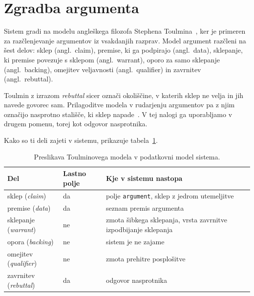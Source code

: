 \documentclass[a4paper, 12pt]{book}
\begin{document}
\section{Zgradba argumenta}
\label{sec:zgradba-argumenta}

Sistem gradi na modelu angleškega filozofa Stephena Toulmina~\cite{toulmin1958}, ker je primeren za razčlenjevanje argumentov iz vsakdanjih razprav. Model argument razčleni na šest delov: sklep (angl.\ claim), premise, ki ga podpirajo (angl.\ data), sklepanje, ki premise povezuje s sklepom (angl.\ warrant), oporo za samo sklepanje (angl.\ backing), omejitev veljavnosti (angl.\ qualifier) in zavrnitev (angl.\ rebuttal).

Toulmin z izrazom \textit{rebuttal} sicer označi okoliščine, v katerih sklep ne velja in jih navede govorec sam. Prilagoditve modela v rudarjenju argumentov pa z njim označijo nasprotno stališče, ki sklep napade~\cite{habernal2017}. V tej nalogi ga uporabljamo v drugem pomenu, torej kot odgovor nasprotnika.

Kako so ti deli zajeti v sistemu, prikazuje tabela~\ref{tbl:toulmin}.

\begin{table}[H]
\centering
\small
{}
\begin{tabular}{@{}p{}p{}p{}@{}}
\toprule
\textbf{Del} & \textbf{Lastno polje} & \textbf{Kje v sistemu nastopa} \\
\midrule
sklep (\textit{claim}) & da & polje \texttt{argument}, sklep z jedrom utemeljitve \\
\midrule
premise (\textit{data}) & da & seznam premis argumenta \\
\midrule
sklepanje (\textit{warrant}) & ne & zmota šibkega sklepanja, vrsta zavrnitve izpodbijanje sklepanja \\
\midrule
opora (\textit{backing}) & ne & sistem je ne zajame \\
\midrule
omejitev (\textit{qualifier}) & ne & zmota prehitre posplošitve \\
\midrule
zavrnitev (\textit{rebuttal}) & da & odgovor nasprotnika \\
\bottomrule
\end{tabular}
\caption{Preslikava Toulminovega modela v podatkovni model sistema.}
\label{tbl:toulmin}
\end{table}
\end{document}
